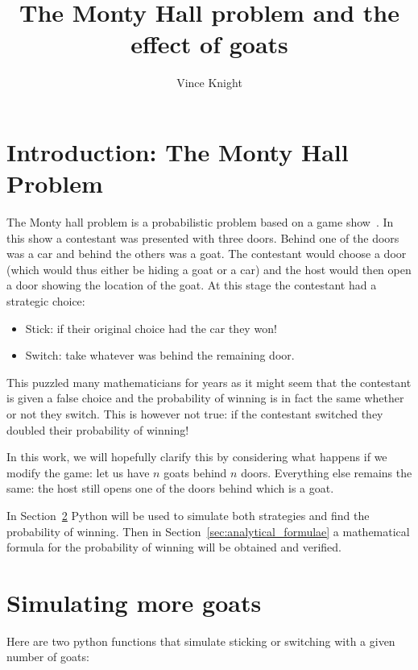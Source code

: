 \documentclass[a4paper]{article}
\title{The Monty Hall problem and the effect of goats}
\author{Vince Knight}
\begin{document}
\maketitle

\section{Introduction: The Monty Hall Problem}

The Monty hall problem is a probabilistic problem based on a game
show~\cite{rosenhouse2009monty}. In this show a contestant was presented with
three doors. Behind one of the doors was a car and behind the others was a
goat. The contestant would choose a door (which would thus either be hiding a
goat or a car) and the host would then open a door showing the location of the
goat. At this stage the contestant had a strategic choice:

\begin{itemize}
    \item Stick: if their original choice had the car they won!
    \item Switch: take whatever was behind the remaining door.
\end{itemize}

This puzzled many mathematicians for years as it might seem that the contestant
is given a false choice and the probability of winning is in fact the same
whether or not they switch. This is however not true: if the contestant
switched they doubled their probability of winning!

In this work, we will hopefully clarify this by considering what happens if we
modify the game: let us have \(n\) goats behind \(n\) doors. Everything else
remains the same: the host still opens one of the doors behind which is a goat.

In Section~\ref{sec:simulation} Python will be used to simulate both strategies
and find the probability of winning. Then in
Section~\ref{sec:analytical_formulae} a mathematical formula for the probability
of winning will be obtained and verified.

\section{Simulating more goats}\label{sec:simulation}

Here are two python functions that simulate sticking or switching with a given
number of goats:
\end{document}
